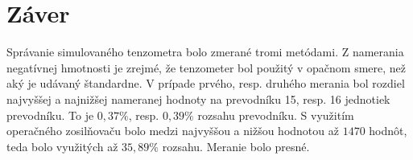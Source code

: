 \section{Záver}
Správanie simulovaného tenzometra bolo zmerané tromi metódami. Z namerania negatívnej hmotnosti je zrejmé, že tenzometer bol použitý v opačnom smere, než aký je udávaný štandardne. V prípade prvého, resp. druhého merania bol rozdiel najvyššej a najnižšej nameranej hodnoty na prevodníku 15, resp. 16 jednotiek prevodníku. To je $0,37\%$, resp. $0,39\%$ rozsahu prevodníku. S využitím operačného zosilňovaču bolo medzi najvyššou a nižšou hodnotou až $1470$ hodnôt, teda bolo využitých až $35,89\%$ rozsahu. 
Meranie bolo presné.